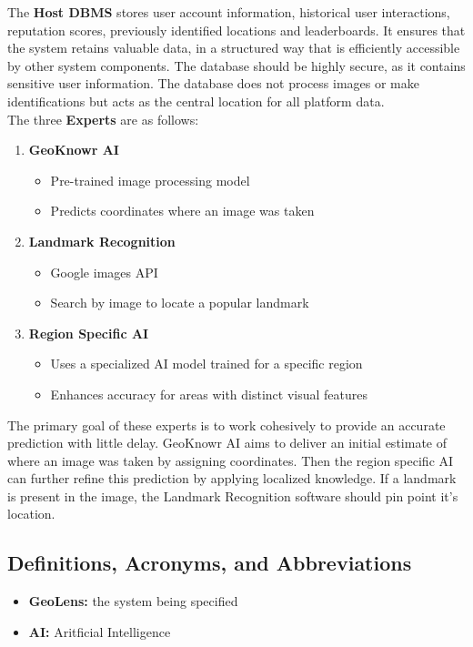 \documentclass[]{article}
\begin{document}
The \textbf{Host DBMS} stores user account information, historical user interactions, reputation scores, previously identified locations and leaderboards. It ensures that the system retains valuable data,
in a structured way that is efficiently accessible by other system components. The database should be highly secure, as it contains sensitive user information. The database does not process images or make
identifications but acts as the central location for all platform data. \\

The three \textbf{Experts} are as follows:
\begin{enumerate}
    \item \textbf{GeoKnowr AI}
    \begin{itemize}
        \item Pre-trained image processing model
        \item Predicts coordinates where an image was taken
    \end{itemize}
    \item \textbf{Landmark Recognition}
    \begin{itemize}
        \item Google images API
        \item Search by image to locate a popular landmark
    \end{itemize}
	\item \textbf{Region Specific AI}
	\begin{itemize}
        \item Uses a specialized AI model trained for a specific region
        \item Enhances accuracy for areas with distinct visual features
    \end{itemize}
\end{enumerate}

The primary goal of these experts is to work cohesively to provide an accurate prediction with little delay. GeoKnowr AI aims to deliver an initial estimate
of where an image was taken by assigning coordinates. Then the region specific AI can further refine this prediction by applying localized knowledge. If a landmark is 
present in the image, the Landmark Recognition software should pin point it's location.

\subsection{Definitions, Acronyms, and Abbreviations}
\label{sub:definitions_acronyms_and_abbreviations}
\begin{itemize}
	\item \textbf{GeoLens:} the system being specified
	\item \textbf{AI:} Aritficial Intelligence
\end{itemize}
\end{document}
